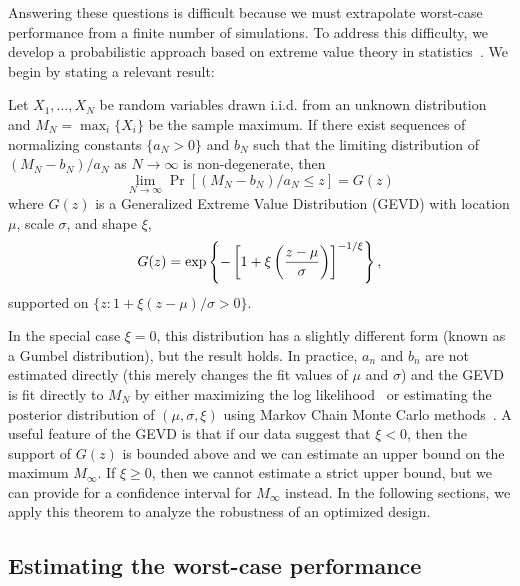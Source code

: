 Answering these questions is difficult because we must extrapolate worst-case performance from a finite number of simulations. To address this difficulty, we develop a probabilistic approach based on extreme value theory in statistics~\cite{sridhar2021improving,wood_zhang_1996,coles_2001}. We begin by stating a relevant result:

\begin{theorem}\label{ch:rss:extreme_value_thm}
    Let $X_1, \ldots, X_N$ be random variables drawn i.i.d. from an unknown distribution and $M_N = \max_i \{ X_i \}$ be the sample maximum. If there exist sequences of normalizing constants $\{a_N > 0\}$ and $b_N$ such that the limiting distribution of $(M_N - b_N)/a_N$ as $N\to\infty$ is non-degenerate, then
    \begin{equation}
        \lim_{N\to\infty} \Pr\left[(M_N - b_N) / a_N \leq z \right] = G(z)
    \end{equation}
    where $G(z)$ is a Generalized Extreme Value Distribution (GEVD) with location $\mu$, scale $\sigma$, and shape $\xi$,
    \begin{equation}
        G(z) = \exp \left\{ -\left[ 1 + \xi\left( \frac{z - \mu}{\sigma} \right) \right]^{-1/\xi} \right\},
    \end{equation}
    supported on $\{z : 1 + \xi(z - \mu)/\sigma > 0\}$.
\end{theorem}

In the special case $\xi = 0$, this distribution has a slightly different form (known as a Gumbel distribution), but the result holds. In practice, $a_n$ and $b_n$ are not estimated directly (this merely changes the fit values of $\mu$ and $\sigma$) and the GEVD is fit directly to $M_N$ by either maximizing the log likelihood~\cite{coles_2001} or estimating the posterior distribution of $(\mu, \sigma, \xi)$ using Markov Chain Monte Carlo methods~\cite{salvatier_wiecki_fonnesbeck_2016}. A useful feature of the GEVD is that if our data suggest that $\xi < 0$, then the support of $G(z)$ is bounded above and we can estimate an upper bound on the maximum $M_\infty$. If $\xi \geq 0$, then we cannot estimate a strict upper bound, but we can provide for a confidence interval for $M_\infty$ instead. In the following sections, we apply this theorem to analyze the robustness of an optimized design.

\subsection{Estimating the worst-case performance}

